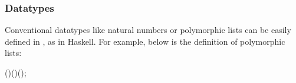 \begin{comment}
Now we can evaluate some lambda expression and get the result back as
in Figure~\ref{fig:pex}

\begin{figure}[ht]
\begin{hscode}\SaveRestoreHook
\column{B}{@{}>{\hspre}l<{\hspost}@{}}%
\column{3}{@{}>{\hspre}l<{\hspost}@{}}%
\column{5}{@{}>{\hspre}l<{\hspost}@{}}%
\column{7}{@{}>{\hspre}l<{\hspost}@{}}%
\column{29}{@{}>{\hspre}l<{\hspost}@{}}%
\column{E}{@{}>{\hspre}l<{\hspost}@{}}%
\>[B]{}\mathbf{let}\;\Varid{show}\mathbin{:}\Conid{Value}\to \Varid{nat}\mathrel{=}{}\<[E]%
\\
\>[B]{}\hsindent{3}{}\<[3]%
\>[3]{}\lambda \Varid{e}\mathbin{:}\Conid{Value}.\,\mathbf{case}\;\Varid{e}\;\mathbf{of}{}\<[E]%
\\
\>[3]{}\hsindent{2}{}\<[5]%
\>[5]{}\Conid{VI}\;(\Varid{n}\mathbin{:}\Varid{nat}){}\<[29]%
\>[29]{}\Rightarrow \Varid{n}{}\<[E]%
\\
\>[B]{}\hsindent{3}{}\<[3]%
\>[3]{}\mid \Conid{VF}\;(\Varid{f}\mathbin{:}\Conid{Value}\to \Conid{Value})\Rightarrow \mathrm{10000}\mbox{\onelinecomment  impossible to reach}{}\<[E]%
\\
\>[B]{}\mathbf{in}{}\<[E]%
\\
\>[B]{}\mathbf{let}\;\Varid{example}\mathbin{:}\Conid{PLambda}\;\Conid{Value}\mathrel{=}{}\<[E]%
\\
\>[B]{}\hsindent{3}{}\<[3]%
\>[3]{}\Conid{App}\;\Conid{Value}\;{}\<[E]%
\\
\>[3]{}\hsindent{4}{}\<[7]%
\>[7]{}(\Conid{Lam}\;\Conid{Value}\;(\lambda \Varid{x}\mathbin{:}\Conid{Value}.\,\Conid{Var}\;\Conid{Value}\;\Conid{X}))\;{}\<[E]%
\\
\>[3]{}\hsindent{4}{}\<[7]%
\>[7]{}(\Conid{Num}\;\Conid{Value}\;\mathrm{42}){}\<[E]%
\\
\>[B]{}\mathbf{in}\;\Varid{show}\;(\Varid{eval}\;\Varid{example})\mbox{\onelinecomment  return 42}{}\<[E]%
\ColumnHook
\end{hscode}\resethooks
\caption{Example of using PHOAS}
\label{fig:pex}
\end{figure}
\end{comment}

\subsubsection{Datatypes}
Conventional datatypes like natural numbers or polymorphic lists can
be easily defined in \sufcc, as in Haskell. For
example, below is the definition of polymorphic lists:
\begin{hscode}\SaveRestoreHook
{}%
%
%
\>[4]{}\;\;(\mathbin{:}\star)\mathrel{=}\mid {}\;(\mathbin{:})\;(\mathbin{:}\;);{}\<[E]%
\ColumnHook
\end{hscode}\resethooks

